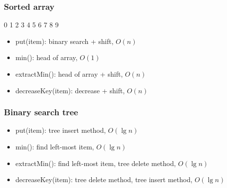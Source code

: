 \documentclass{beamer}
\begin{document}
\begin{frame}
 \frametitle{Sorted array}
 \begin{center}
  0 1 2 3 4 5 6 7 8 9
 \end{center}
 \begin{itemize}
  \item put(item): binary search + shift, $O(n)$
  \item min(): head of array, $O(1)$
  \item extractMin(): head of array + shift, $O(n)$
  \item decreaseKey(item): decrease + shift, $O(n)$
 \end{itemize}
\end{frame}

\begin{frame}
 \frametitle{Binary search tree}
 \begin{center}
  \scalebox{0.6} {
  }
 \end{center}
 \begin{itemize}
  \item put(item): tree insert method, $O(\lg n)$
  \item min(): find left-most item, $O(\lg n)$
  \item extractMin(): find left-most item, tree delete method, $O(\lg n)$
  \item decreaseKey(item): tree delete method, tree insert method, $O(\lg n)$
 \end{itemize}
\end{frame}
\end{document}
